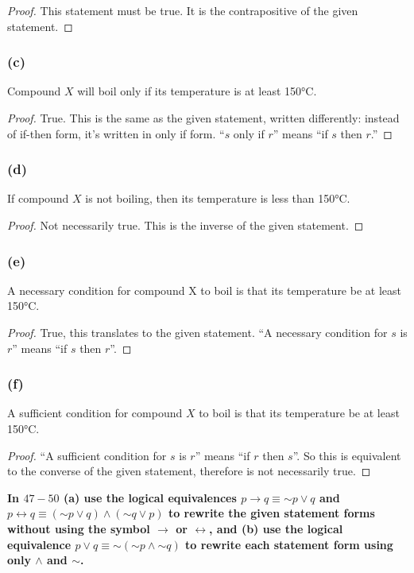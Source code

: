 \documentclass[14pt]{extarticle}
\newcommand{\bic}{\leftrightarrow}
\begin{document}
\begin{proof}
    This statement must be true. It is the contrapositive of the given statement.
\end{proof}

\subsubsection{(c)}
Compound $X$ will boil only if its temperature is at least 150°C.

\begin{proof}
    True. This is the same as the given statement, written differently: instead of if-then form, it's written in only if form. ``$s$ only if $r$'' means ``if $s$ then $r$.''
\end{proof}

\subsubsection{(d)}
If compound $X$ is not boiling, then its temperature is less
than 150°C.

\begin{proof}
    Not necessarily true. This is the inverse of the given statement.
\end{proof}

\subsubsection{(e)}
A necessary condition for compound X to boil is that its temperature be at least 150°C.

\begin{proof}
    True, this translates to the given statement. ``A necessary condition for $s$ is $r$'' means ``if $s$ then $r$''.
\end{proof}

\subsubsection{(f)}
A sufficient condition for compound $X$ to boil is that its temperature be at least 150°C.

\begin{proof}
    ``A sufficient condition for $s$ is $r$'' means ``if $r$ then $s$''. So this is equivalent to the converse of the given statement, therefore is not necessarily true.
\end{proof}

{\bf In $47-50$ (a) use the logical equivalences $p \to q \equiv {\sim p} \vee q$ and $p \bic q \equiv ({\sim p} \vee q) \wedge ({\sim q} \vee p)$ to rewrite the given statement forms without using the symbol $\to$ or $\bic$, and (b) use the logical equivalence $p \vee q \equiv {\sim({\sim p} \wedge {\sim q})}$ to rewrite each statement form using only $\wedge$ and $\sim$.}
\end{document}
